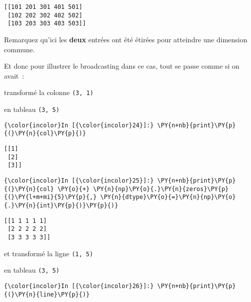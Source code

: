     \begin{Verbatim}[commandchars=\\\{\},frame=single,framerule=0.3mm,rulecolor=\color{cellframecolor}]
[[101 201 301 401 501]
 [102 202 302 402 502]
 [103 203 303 403 503]]
\end{Verbatim}

    Remarquez qu'ici les \textbf{deux} entrées ont été étirées pour
atteindre une dimension commune.

    Et donc pour illustrer le broadcasting dans ce cas, tout se passe comme
si on avait~:

    transformé la colonne \texttt{(3,\ 1)}

    en tableau \texttt{(3,\ 5)}

    \begin{Verbatim}[commandchars=\\\{\},frame=single,framerule=0.3mm,rulecolor=\color{cellframecolor}]
{\color{incolor}In [{\color{incolor}24}]:} \PY{n+nb}{print}\PY{p}{(}\PY{n}{col}\PY{p}{)}
\end{Verbatim}


    \begin{Verbatim}[commandchars=\\\{\},frame=single,framerule=0.3mm,rulecolor=\color{cellframecolor}]
[[1]
 [2]
 [3]]
\end{Verbatim}

    \begin{Verbatim}[commandchars=\\\{\},frame=single,framerule=0.3mm,rulecolor=\color{cellframecolor}]
{\color{incolor}In [{\color{incolor}25}]:} \PY{n+nb}{print}\PY{p}{(}\PY{n}{col} \PY{o}{+} \PY{n}{np}\PY{o}{.}\PY{n}{zeros}\PY{p}{(}\PY{l+m+mi}{5}\PY{p}{,} \PY{n}{dtype}\PY{o}{=}\PY{n}{np}\PY{o}{.}\PY{n}{int}\PY{p}{)}\PY{p}{)}
\end{Verbatim}


    \begin{Verbatim}[commandchars=\\\{\},frame=single,framerule=0.3mm,rulecolor=\color{cellframecolor}]
[[1 1 1 1 1]
 [2 2 2 2 2]
 [3 3 3 3 3]]
\end{Verbatim}

    et transformé la ligne \texttt{(1,\ 5)}

    en tableau \texttt{(3,\ 5)}

    \begin{Verbatim}[commandchars=\\\{\},frame=single,framerule=0.3mm,rulecolor=\color{cellframecolor}]
{\color{incolor}In [{\color{incolor}26}]:} \PY{n+nb}{print}\PY{p}{(}\PY{n}{line}\PY{p}{)}
\end{Verbatim}


